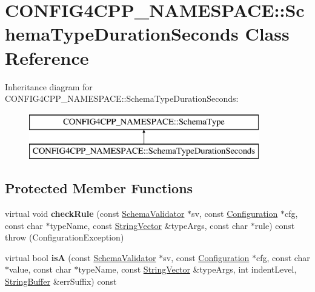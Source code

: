 \hypertarget{classCONFIG4CPP__NAMESPACE_1_1SchemaTypeDurationSeconds}{\section{C\-O\-N\-F\-I\-G4\-C\-P\-P\-\_\-\-N\-A\-M\-E\-S\-P\-A\-C\-E\-:\-:Schema\-Type\-Duration\-Seconds Class Reference}
\label{classCONFIG4CPP__NAMESPACE_1_1SchemaTypeDurationSeconds}
}
Inheritance diagram for C\-O\-N\-F\-I\-G4\-C\-P\-P\-\_\-\-N\-A\-M\-E\-S\-P\-A\-C\-E\-:\-:Schema\-Type\-Duration\-Seconds\-:\begin{figure}[H]
\begin{center}
\leavevmode
\includegraphics[height=2.000000cm]{classCONFIG4CPP__NAMESPACE_1_1SchemaTypeDurationSeconds}
\end{center}
\end{figure}
\subsection*{Protected Member Functions}
\begin{DoxyCompactItemize}
\item 
\hypertarget{classCONFIG4CPP__NAMESPACE_1_1SchemaTypeDurationSeconds_a510a328ee7f15382c245f517c026231a}{virtual void {\bfseries check\-Rule} (const \hyperlink{classCONFIG4CPP__NAMESPACE_1_1SchemaValidator}{Schema\-Validator} $\ast$sv, const \hyperlink{classCONFIG4CPP__NAMESPACE_1_1Configuration}{Configuration} $\ast$cfg, const char $\ast$type\-Name, const \hyperlink{classCONFIG4CPP__NAMESPACE_1_1StringVector}{String\-Vector} \&type\-Args, const char $\ast$rule) const   throw (\-Configuration\-Exception)}\label{classCONFIG4CPP__NAMESPACE_1_1SchemaTypeDurationSeconds_a510a328ee7f15382c245f517c026231a}

\item 
\hypertarget{classCONFIG4CPP__NAMESPACE_1_1SchemaTypeDurationSeconds_abf008f4905cefc9ab3d537fb3ae6d330}{virtual bool {\bfseries is\-A} (const \hyperlink{classCONFIG4CPP__NAMESPACE_1_1SchemaValidator}{Schema\-Validator} $\ast$sv, const \hyperlink{classCONFIG4CPP__NAMESPACE_1_1Configuration}{Configuration} $\ast$cfg, const char $\ast$value, const char $\ast$type\-Name, const \hyperlink{classCONFIG4CPP__NAMESPACE_1_1StringVector}{String\-Vector} \&type\-Args, int indent\-Level, \hyperlink{classCONFIG4CPP__NAMESPACE_1_1StringBuffer}{String\-Buffer} \&err\-Suffix) const }\label{classCONFIG4CPP__NAMESPACE_1_1SchemaTypeDurationSeconds_abf008f4905cefc9ab3d537fb3ae6d330}

\end{DoxyCompactItemize}
